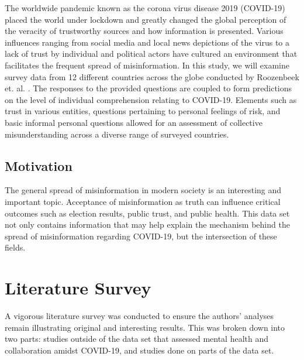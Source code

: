 \documentclass[11pt,sigconf]{acmart}
\begin{document}
The worldwide pandemic known as the corona virus disease 2019 (COVID-19) placed the world under lockdown and greatly changed the global perception of the veracity of trustworthy sources and how information is presented. Various influences ranging from social media and local news depictions of the virus to a lack of trust by individual and political actors have cultured an environment that facilitates the frequent spread of misinformation. In this study, we will examine survey data from 12 different countries across the globe conducted by Roozenbeek et. al. \cite{roozenbeek}. The responses to the provided questions are coupled to form predictions on the level of individual comprehension relating to COVID-19. Elements such as trust in various entities, questions pertaining to personal feelings of risk, and basic informal personal questions allowed for an assessment of collective misunderstanding across a diverse range of surveyed countries.

\subsection{Motivation}

The general spread of misinformation in modern society is an interesting and important topic. Acceptance of misinformation as truth can influence critical outcomes such as election results, public trust, and public health. This data set not only contains information that may help explain the mechanism behind the spread of misinformation regarding COVID-19, but the intersection of these fields.





\section{Literature Survey}

A vigorous literature survey was conducted to ensure the authors' analyses remain illustrating original and interesting results. This was broken down into two parts: studies outside of the data set that assessed mental health and collaboration amidst COVID-19, and studies done on parts of the data set.
\end{document}
